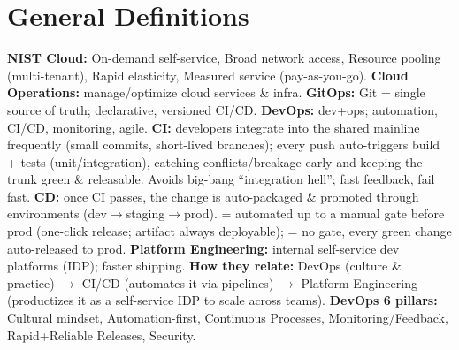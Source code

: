 \section{General Definitions}
\textbf{NIST Cloud:} On-demand self-service, Broad network access, Resource pooling (multi-tenant), Rapid elasticity, Measured service (pay-as-you-go).
\textbf{Cloud Operations:} manage/optimize cloud services \& infra.
\textbf{GitOps:} Git = single source of truth; declarative, versioned CI/CD.
\textbf{DevOps:} dev+ops; automation, CI/CD, monitoring, agile.
\textbf{CI:} developers integrate into the shared mainline frequently (small commits, short-lived branches); every push auto-triggers build + tests (unit/integration), catching conflicts/breakage early and keeping the trunk green \& releasable. Avoids big-bang ``integration hell''; fast feedback, fail fast.
\textbf{CD:} once CI passes, the change is auto-packaged \& promoted through environments (dev$\to$staging$\to$prod).  = automated up to a manual gate before prod (one-click release; artifact always deployable);  = no gate, every green change auto-released to prod.
\textbf{Platform Engineering:} internal self-service dev platforms (IDP); faster shipping.
\textbf{How they relate:} DevOps (culture \& practice) $\to$ CI/CD (automates it via pipelines) $\to$ Platform Engineering (productizes it as a self-service IDP to scale across teams).
\textbf{DevOps 6 pillars:} Cultural mindset, Automation-first, Continuous Processes, Monitoring/Feedback, Rapid+Reliable Releases, Security.
